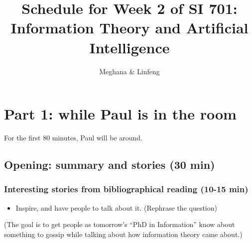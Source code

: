 \documentclass[12pt]{article}
\title{Schedule for Week 2 of SI 701: \\Information Theory and Artificial
Intelligence}
\author{Meghana \& Linfeng }
\theoremstyle{definition}
\theoremstyle{plain}
\begin{document}
\maketitle
\section{Part 1: while Paul is in the room}
For the first 80 minutes, Paul will be around.

\subsection{Opening: summary and stories (30 min)}

\subsubsection{Interesting stories from bibliographical reading (10-15 min)}
\begin{itemize}
    \item Inspire, and have people to talk about it. (Rephrase the question)
\end{itemize}

(The goal is to get people as tomorrow's ``PhD in Information'' know about
something to gossip while talking about how information theory came about.)
\end{document}

